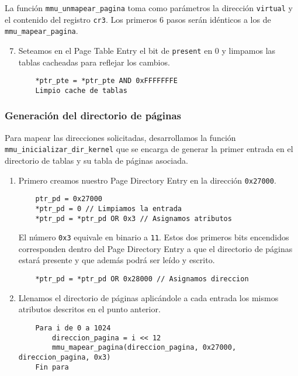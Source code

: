 La función \texttt{mmu\_unmapear\_pagina} toma como parámetros la dirección
\texttt{virtual} y el contenido del registro \texttt{cr3}. Los primeros 6 pasos
serán idénticos a los de \texttt{mmu\_mapear\_pagina}.

\begin{enumerate}
	\setcounter{enumi}{6}
	\item Seteamos en el Page Table Entry el bit de \texttt{present} en 0 y
		limpamos las tablas cacheadas para reflejar los cambios.
	\begin{lstlisting}
	*ptr_pte = *ptr_pte AND 0xFFFFFFFE
	Limpio cache de tablas
	\end{lstlisting}
\end{enumerate}

\subsubsection{Generación del directorio de páginas}

Para mapear las direcciones solicitadas, desarrollamos la función
\texttt{mmu\_inicializar\_dir\_kernel} que se encarga de generar la primer
entrada en el directorio de tablas y su tabla de páginas asociada.

\begin{enumerate}
	\item Primero creamos nuestro Page Directory Entry en la dirección
		\texttt{0x27000}.
	\begin{lstlisting}
	ptr_pd = 0x27000
	*ptr_pd = 0 // Limpiamos la entrada
	*ptr_pd = *ptr_pd OR 0x3 // Asignamos atributos
	\end{lstlisting}
	El número \texttt{0x3} equivale en binario a \texttt{11}. Estos dos primeros
	bits encendidos corresponden dentro del Page Directory Entry a que el
	directorio de páginas estará presente y que además podrá ser leído y
	escrito.
	\begin{lstlisting}
	*ptr_pd = *ptr_pd OR 0x28000 // Asignamos direccion
	\end{lstlisting}

	\item Llenamos el directorio de páginas aplicándole a cada entrada los
		mismos atributos descritos en el punto anterior.
	\begin{lstlisting}
	Para i de 0 a 1024
		direccion_pagina = i << 12
		mmu_mapear_pagina(direccion_pagina, 0x27000, direccion_pagina, 0x3)
	Fin para
	\end{lstlisting}
\end{enumerate}

